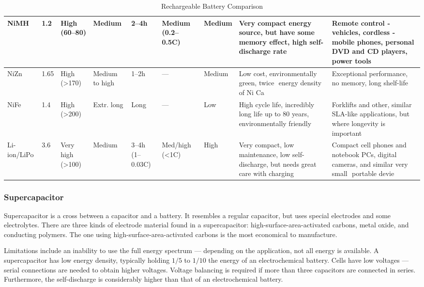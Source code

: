 \documentclass[../../document]{subfiles}
\begin{document}
\begin{sidewaystable}
\begin{center}
\begin{tabular}{p{.06\textheight}p{.06\textheight}p{.05\textheight}p{.05\textheight}p{.06\textheight}p{.09\textheight}p{.05\textheight}p{.22\textheight}p{.2\textheight}}
			\midrule
			NiMH & 1.2 & High (60–80) & Medium & 2–4\unit{\hour} & Medium (0.2–0.5C)
					 & Medium & Very compact energy source, but have some memory effect,
			high self-discharge rate & Remote control ­ vehicles, cordless ­ mobile
			phones, personal DVD and CD players, power tools\\ 
			\midrule
			NiZn & 1.65 & High
			(>170) & Medium to high & 1–2\unit{\hour} & --- & Medium & Low cost,
			environmentally green, twice ­ energy density of Ni­ Ca & Exceptional
			performance, no memory, long shelf-life\\
			\midrule
			NiFe & 1.4 & High (>200)  & Extr. long & Long & --- & Low & High
			cycle life, incredibly long life up to 80 years, environmentally friendly
					 & Forklifts and other, similar SLA-like applications, but where
			longevity is important\\ 
			\midrule
			Li-ion/LiPo & 3.6 & Very high (>100) & Medium &
			3–4\unit{\hour} (1–0.03C) &  Med/high (<1C) & High & Very compact, low
			maintenance, low self-discharge, but needs great care with charging &
			Compact cell phones and notebook PCs, digital cameras, and similar very
			small ­ portable devie\\
			\bottomrule
		\end{tabular}
	\end{center}
	\caption{Rechargeable Battery Comparison \cite[p. 284]{practical_electronics}}
\end{sidewaystable}

\subsubsection{Supercapacitor}
Supercapacitor is a cross between a capacitor and a battery. It resembles a
regular capacitor, but uses special electrodes and some electrolytes. There are
three kinds of electrode material found in a supercapacitor:
high-surface-area-activated carbons, metal oxide, and conducting polymers. The
one using high-surface-area-activated carbons is the most economical to
manufacture. \cite{practical_electronics}

Limitations include an inability to use the full energy spectrum --- depending
on the application, not all energy is available. A supercapacitor has low
energy density, typically holding \(1/5\)  to \(1/10\) the energy of an
electrochemical battery. Cells have low voltages --- serial connections are
needed to obtain higher voltages. Voltage balancing is required if more than
three capacitors are connected in series. Furthermore, the self-discharge is
considerably higher than that of an electrochemical battery. 
\cite{practical_electronics}
\end{document}
